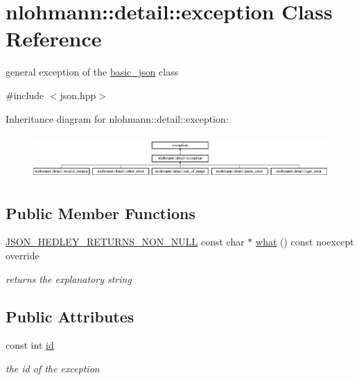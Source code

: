 \hypertarget{classnlohmann_1_1detail_1_1exception}{}\section{nlohmann\+::detail\+::exception Class Reference}
\label{classnlohmann_1_1detail_1_1exception}


general exception of the \mbox{\hyperlink{classnlohmann_1_1basic__json}{basic\+\_\+json}} class  




{\ttfamily \#include $<$json.\+hpp$>$}

Inheritance diagram for nlohmann\+::detail\+::exception\+:\begin{figure}[H]
\begin{center}
\leavevmode
\includegraphics[height=1.680000cm]{de/df2/classnlohmann_1_1detail_1_1exception}
\end{center}
\end{figure}
\subsection*{Public Member Functions}
\begin{DoxyCompactItemize}
\item 
\mbox{\hyperlink{json_8hpp_a5f2aaec3b681d0a72f7d6e90b70cdcd1}{J\+S\+O\+N\+\_\+\+H\+E\+D\+L\+E\+Y\+\_\+\+R\+E\+T\+U\+R\+N\+S\+\_\+\+N\+O\+N\+\_\+\+N\+U\+LL}} const char $\ast$ \mbox{\hyperlink{classnlohmann_1_1detail_1_1exception_a2ecff34cee144f843644a252a07cdadc}{what}} () const noexcept override
\begin{DoxyCompactList}\small\item\em returns the explanatory string \end{DoxyCompactList}\end{DoxyCompactItemize}
\subsection*{Public Attributes}
\begin{DoxyCompactItemize}
\item 
const int \mbox{\hyperlink{classnlohmann_1_1detail_1_1exception_a0d4589a3fb54e81646d986c05efa3b9a}{id}}
\begin{DoxyCompactList}\small\item\em the id of the exception \end{DoxyCompactList}\end{DoxyCompactItemize}
